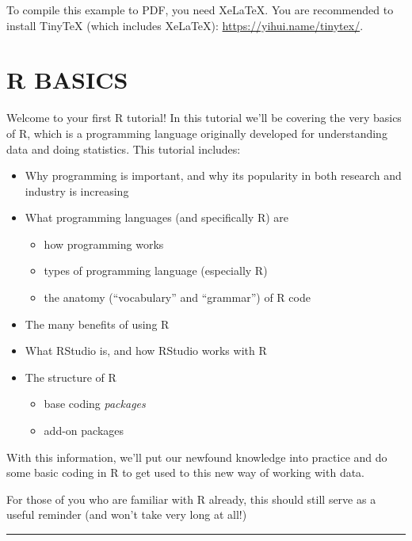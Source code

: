 \documentclass[
]{book}
\providecommand{\tightlist}{%
  \setlength{\itemsep}{0pt}\setlength{\parskip}{0pt}}
\begin{document}
To compile this example to PDF, you need XeLaTeX. You are recommended to install TinyTeX (which includes XeLaTeX): \url{https://yihui.name/tinytex/}.

\hypertarget{r-basics}{%
\chapter{R BASICS}\label{r-basics}}

Welcome to your first R tutorial! In this tutorial we'll be covering the very basics of R, which is a programming language originally developed for
understanding data and doing statistics. This tutorial includes:

\begin{itemize}
\tightlist
\item
  Why programming is important, and why its popularity in both research
  and industry is increasing
\item
  What programming languages (and specifically R) are

  \begin{itemize}
  \tightlist
  \item
    how programming works
  \item
    types of programming language (especially R)
  \item
    the anatomy (``vocabulary'' and ``grammar'') of R code
  \end{itemize}
\item
  The many benefits of using R
\item
  What RStudio is, and how RStudio works with R
\item
  The structure of R

  \begin{itemize}
  \tightlist
  \item
    base coding \emph{packages}
  \item
    add-on packages
  \end{itemize}
\end{itemize}

With this information, we'll put our newfound knowledge into practice and
do some basic coding in R to get used to this new way of working with data.

For those of you who are familiar with R already, this should still serve as a
useful reminder (and won't take very long at all!)\\
\hspace*{0.333em}

\begin{center}\rule{0.5\linewidth}{\linethickness}\end{center}
\end{document}
